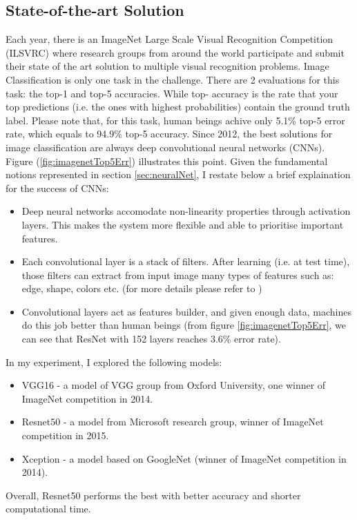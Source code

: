\subsection{State-of-the-art Solution}
Each year, there is an ImageNet Large Scale Visual Recognition Competition (ILSVRC) \cite{ILSVRC15} where research groups from around the world participate and submit their state of the art solution to multiple visual recognition problems. Image Classification is only one task in the challenge. There are 2 evaluations for this task: the top-1 and top-5 accuracies. While top- accuracy is the rate that your top  predictions (i.e. the  ones with highest probabilities) contain the ground truth label. Please note that, for this task, human beings achive only 5.1\% top-5 error rate, which equals to 94.9\% top-5 accuracy. Since 2012, the best solutions for image classification are always deep convolutional neural networks (CNNs). Figure (\ref{fig:imagenetTop5Err}) illustrates this point. Given the fundamental notions represented in section \ref{sec:neuralNet}, I restate below a brief explaination for the success of CNNs:
\begin{itemize}
	\item Deep neural networks accomodate non-linearity properties through activation layers. This makes the system more flexible and able to prioritise important features.
	\item Each convolutional layer is a stack of filters. After learning (i.e. at test time), those filters can extract from input image many types of features such as: edge, shape, colors etc. (for more details please refer to \cite{DeepVis:2015})
	\item Convolutional layers act as features builder, and given enough data, machines do this job better than human beings (from figure \ref{fig:imagenetTop5Err}, we can see that ResNet with 152 layers reaches 3.6\% error rate).
\end{itemize}
In my experiment, I explored the following models:
\begin{itemize}
	\item VGG16 \cite{DBLP:journals/corr/SimonyanZ14a} - a model of VGG group from Oxford University, one winner of ImageNet competition in 2014.
	\item Resnet50 \cite{DBLP:journals/corr/HeZRS15} - a model from Microsoft research group, winner of ImageNet competition in 2015.
	\item Xception \cite{DBLP:journals/corr/Chollet16a} - a model based on GoogleNet \cite{DBLP:journals/corr/SzegedyVISW15} (winner of ImageNet competition in 2014).
\end{itemize}
Overall, Resnet50 performs the best with better accuracy and shorter computational time.

